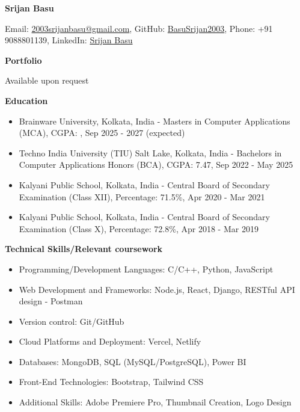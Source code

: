 \documentclass[a4paper,10pt]{article}
\newcommand{\resitem}[1]{\item #1}
\newcommand{\resheading}[1]{\vspace{0.5em} {\small \colorbox{mygrey}{{\begin{minipage}{0.975\textwidth}{{\textbf{#1}}}\end{minipage}}}} \vspace{0.5em}}
\begin{document}
\begin{center} \Large{\textbf{Srijan Basu}} \end{center}

\vspace{2pt}

\begin{center} Email: \href{mailto:2003srijanbasu@gmail.com}{2003srijanbasu@gmail.com}, GitHub: \href{https://github.com/BasuSrijan2003}{BasuSrijan2003}, Phone: +91 9088801139, LinkedIn: \href{https://www.linkedin.com/in/srijan-basu/}{Srijan Basu} \end{center}

\resheading{Portfolio}
\resitem{Available upon request}

\resheading{Education}
\begin{itemize}
\resitem{Brainware University, Kolkata, India - Masters in Computer Applications (MCA), CGPA: , Sep 2025 - 2027 (expected)}
\resitem{Techno India University (TIU) Salt Lake, Kolkata, India - Bachelors in Computer Applications Honors (BCA), CGPA: 7.47, Sep 2022 - May 2025}
\resitem{Kalyani Public School, Kolkata, India - Central Board of Secondary Examination (Class XII), Percentage: 71.5\%, Apr 2020 - Mar 2021}
\resitem{Kalyani Public School, Kolkata, India - Central Board of Secondary Examination (Class X), Percentage: 72.8\%, Apr 2018 - Mar 2019}
\end{itemize}

\resheading{Technical Skills/Relevant coursework}
\begin{itemize}
\resitem{Programming/Development Languages: C/C++, Python, JavaScript}
\resitem{Web Development and Frameworks: Node.js, React, Django, RESTful API design - Postman}
\resitem{Version control: Git/GitHub}
\resitem{Cloud Platforms and Deployment: Vercel, Netlify}
\resitem{Databases: MongoDB, SQL (MySQL/PostgreSQL), Power BI}
\resitem{Front-End Technologies: Bootstrap, Tailwind CSS}
\resitem{Additional Skills: Adobe Premiere Pro, Thumbnail Creation, Logo Design}
\end{itemize}
\end{document}
